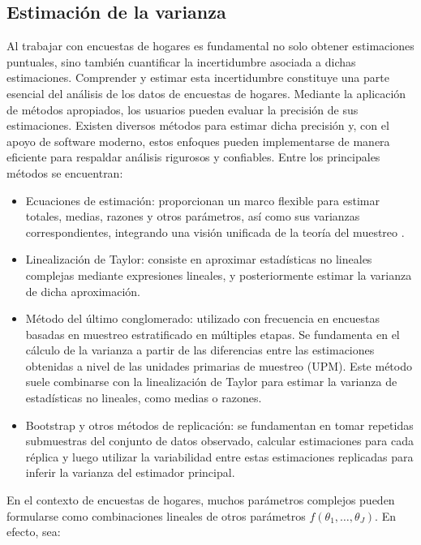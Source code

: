 \documentclass[
  spanish,
  12pt,
]{book}
\begin{document}
\subsection{Estimación de la varianza}\label{estimacion-de-la-varianza}

Al trabajar con encuestas de hogares es fundamental no solo obtener estimaciones puntuales, sino también cuantificar la incertidumbre asociada a dichas estimaciones. Comprender y estimar esta incertidumbre constituye una parte esencial del análisis de los datos de encuestas de hogares. Mediante la aplicación de métodos apropiados, los usuarios pueden evaluar la precisión de sus estimaciones. Existen diversos métodos para estimar dicha precisión y, con el apoyo de software moderno, estos enfoques pueden implementarse de manera eficiente para respaldar análisis rigurosos y confiables. Entre los principales métodos se encuentran:

\begin{itemize}
\item
  Ecuaciones de estimación: proporcionan un marco flexible para estimar totales, medias, razones y otros parámetros, así como sus varianzas correspondientes, integrando una visión unificada de la teoría del muestreo \citep{binder1983variances}.
\item
  Linealización de Taylor: consiste en aproximar estadísticas no lineales complejas mediante expresiones lineales, y posteriormente estimar la varianza de dicha aproximación.
\item
  Método del último conglomerado: utilizado con frecuencia en encuestas basadas en muestreo estratificado en múltiples etapas. Se fundamenta en el cálculo de la varianza a partir de las diferencias entre las estimaciones obtenidas a nivel de las unidades primarias de muestreo (UPM). Este método suele combinarse con la linealización de Taylor para estimar la varianza de estadísticas no lineales, como medias o razones.
\item
  Bootstrap y otros métodos de replicación: se fundamentan en tomar repetidas submuestras del conjunto de datos observado, calcular estimaciones para cada réplica y luego utilizar la variabilidad entre estas estimaciones replicadas para inferir la varianza del estimador principal.
\end{itemize}

En el contexto de encuestas de hogares, muchos parámetros complejos pueden formularse como combinaciones lineales de otros parámetros \(f(\theta_1,\ldots,\theta_J)\). En efecto, sea:
\end{document}
